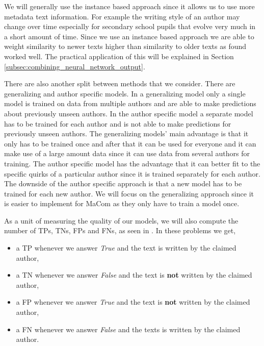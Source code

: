 We will generally use the instance based approach since it allows us to use
more metadata text information. For example the writing style of an author may
change over time especially for secondary school pupils that evolve very much
in a short amount of time. Since we use an instance based approach we are able
to weight similarity to newer texts higher than similarity to older texts as
\citet{hansen2014} found worked well. The practical application of this will be
explained in Section \ref{subsec:combining_neural_network_output}.

There are also another split between methods that we consider. There are
generalizing and author specific models. In a generalizing model only a single
model is trained on data from multiple authors and are able to make predictions
about previously unseen authors. In the author specific model a separate model
has to be trained for each author and is not able to make predictions for
previously unseen authors. The generalizing models' main advantage is that it
only has to be trained once and after that it can be used for everyone and it
can make use of a large amount data since it can use data from several authors
for training. The author specific model has the advantage that it can better fit
to the specific quirks of a particular author since it is trained separately
for each author. The downside of the author specific approach is that a new
model has to be trained for each new author. We will focus on the generalizing
approach since it is easier to implement for MaCom as they only have to train a
model once.

As a unit of measuring the quality of our models, we will also compute the
number of \glspl{TP}, \glspl{TN}, \glspl{FP} and \glspl{FN}, as seen in
\citet{US}. In these problems we get,

\begin{itemize}
    \item a \gls{TP} whenever we answer \textit{True} and the text is written
        by the claimed author,
    \item a \gls{TN} whenever we answer \textit{False} and the text is
        \textbf{not} written by the claimed author,
    \item a \gls{FP} whenever we answer \textit{True} and the text is
        \textbf{not} written by the claimed author,
    \item a \gls{FN} whenever we answer \textit{False} and the texts is written
        by the claimed author.
\end{itemize}

